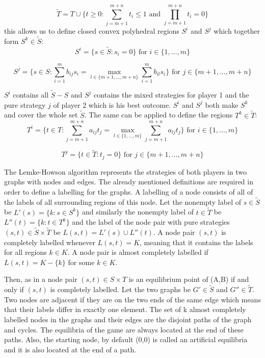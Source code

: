 {\begin{equation}
\tilde{T} = T \cup \{t \geq 0: \sum_{j=m+1}^{m+n} t_i \leq 1 \text{ and } \prod_{j=m+1}^{m+n} t_i = 0 \}
\end{equation}
this allows us to define closed convex polyhedral regions $S^i$ and $S^j$ which together form $S^k \in \tilde{S}$:
\begin{equation}
S^i = \{ s \in \tilde{S}: s_i = 0 \} \text{ for } i \in \{1,...,m\}
\end{equation}


\begin{equation}
S^j = \Big\{ s \in S: \sum_{i=1}^{m} b_{ij} s_i = \max_{l \in \{m+1,...,m+n\}} \sum_{i=1}^{m} b_{il} s_i \Big\} \text{ for } j \in \{m+1,...,m+n\}
\end{equation}


$S^i$ contains all $\tilde{S}-S$ and $S^j$ contains the mixed strategies for player 1 and the pure strategy $j$ of player 2 which is his best outcome. $S^i$ and $S^j$ both make $S^k$ and cover the whole set $\tilde{S}$. The same can be applied to define the regions $T^k \in \tilde{T}$:
\begin{equation} 
T^i = \Big\{ t \in T: \sum_{j=m+1}^{m+n} a_{ij} t_j = \max_{l \in \{1,...,m\}} \sum_{j=m+1}^{m+n} a_{lj} t_j \Big\} \text{ for } i \in \{1,...,m\} 
\end{equation}

\begin{equation}
T^j = \{ t \in \tilde{T}: t_j = 0 \} \text{ for } j \in \{m+1,...,m+n\} 
\end{equation}


The Lemke-Howson algorithm represents the strategies of both players in two graphs with nodes and edges. The already mentioned definitions are required in order to define a labelling for the graphs. A labelling of a node consists of all of the labels of all surrounding regions of this node. Let the nonempty label of $s \in \tilde{S}$ be $L'(s) = \{ k: s \in S^k \}$ and similarly the nonempty label of $t \in \tilde{T}$ be $L''(t) = \{ k: t \in T^k \}$ and the label of the node pair with pure strategies $(s,t) \in \tilde{S} \times \tilde{T}$ be $L(s,t) = L'(s) \cup L''(t)$. A node pair $(s,t)$ is completely labelled whenever $L(s,t) = K$, meaning that it contains the labels for all regions $k \in K$. A node pair is almost completely labelled if $L(s,t) = K - \{k\}$ for some $k \in K$. 

Then, as in \citet{shapley1974note} a node pair $(s,t) \in S \times T$ is an equilibrium point of (A,B) if and only if $(s,t)$ is completely labelled. Let the two graphs be $G' \in \tilde{S}$ and $G'' \in \tilde{T}$. Two nodes are adjacent if they are on the two ends of the same edge which means that their labels differ in exactly one element. The set of k almost completely labelled nodes in the graphs and their edges are the disjoint paths of the graph and cycles. The equilibria of the game are always located at the end of these paths. Also, the starting node, by default (0,0) is called an artificial equilibria and it is also located at the end of a path.

}
